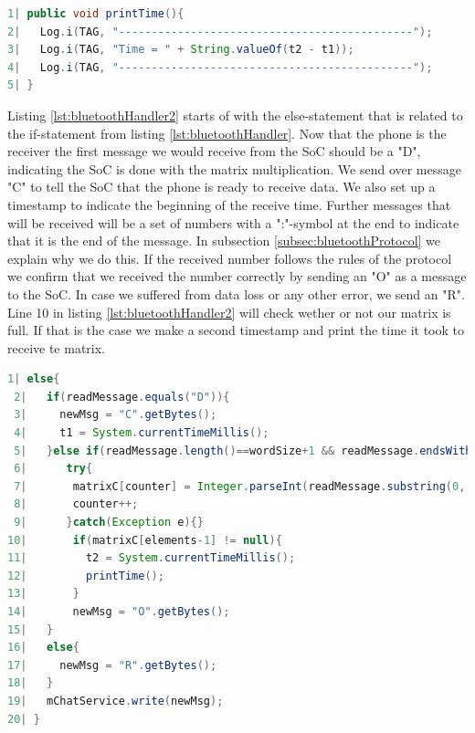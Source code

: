 \documentclass[a4paper, 11pt]{report}
\begin{document}
\begin{lstlisting}[caption={Prints elapsed time for sending matrices},captionpos=b, label={lst:bluetoothPrint}, language=java, float=hbtp]
1| public void printTime(){
2|   Log.i(TAG, "---------------------------------------------");
3|   Log.i(TAG, "Time = " + String.valueOf(t2 - t1));
4|   Log.i(TAG, "---------------------------------------------");
5| }
\end{lstlisting}

Listing \ref{lst:bluetoothHandler2} starts of with the else-statement that is related to the if-statement from listing \ref{lst:bluetoothHandler}. Now that the phone is the receiver the first message we would receive from the SoC should be a "D", indicating the SoC is done with the matrix multiplication. We send over message "C" to tell the SoC that the phone is ready to receive data. We also set up a timestamp to indicate the beginning of the receive time. Further messages that will be received will be a set of numbers with a ":"-symbol at the end to indicate that it is the end of the message. In subsection \ref{subsec:bluetoothProtocol} we explain why we do this. If the received number follows the rules of the protocol we confirm that we received the number correctly by sending an "O" as a message to the SoC. In case we suffered from data loss or any other error, we send an "R". Line 10 in listing \ref{lst:bluetoothHandler2} will check wether or not our matrix is full. If that is the case we make a second timestamp and print the time it took to receive te matrix.

\begin{lstlisting}[caption={Bluetooth message handler as receiver},captionpos=b, label={lst:bluetoothHandler2}, language=java, float=ht]
 1| else{
 2|   if(readMessage.equals("D")){
 3|     newMsg = "C".getBytes();
 4|     t1 = System.currentTimeMillis();
 5|   }else if(readMessage.length()==wordSize+1 && readMessage.endsWith(":")){
 6|      try{
 7|       matrixC[counter] = Integer.parseInt(readMessage.substring(0, wordSize));
 8|       counter++;
 9|      }catch(Exception e){}
10|       if(matrixC[elements-1] != null){
11|         t2 = System.currentTimeMillis();
12|         printTime();
13|       }
14|       newMsg = "O".getBytes();
15|   }
16|   else{
17|     newMsg = "R".getBytes();
18|   }
19|   mChatService.write(newMsg);
20| }
\end{lstlisting}
\end{document}
